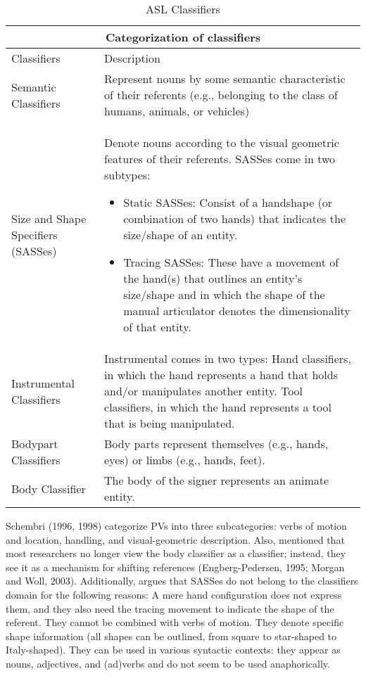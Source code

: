 \begin{table}[H]
    \centering  
\begin{tabular}{ |p{4cm}|p{7cm}|}
\hline
\multicolumn{2}{|c|}{Categorization of classifiers} \\
\hline
 Classifiers & Description \\
\hline
Semantic Classifiers & Represent nouns by some semantic characteristic of their 
referents (e.g., belonging to the class of humans, animals, or vehicles) \\ \hline
Size and Shape Specifiers (SASSes) & Denote nouns according to the visual geometric 
features of their referents. 
SASSes come in two subtypes:
\begin{itemize}
\item Static SASSes: Consist of a handshape (or combination of two hands) that 
indicates the size/shape of an entity.
\item Tracing SASSes: These have a movement of the hand(s) that outlines an entity’s 
size/shape and in which the shape of the manual articulator denotes the 
dimensionality of that entity.
\end{itemize}
\\ \hline
Instrumental Classifiers & Instrumental comes in two types:
 Hand classifiers, in which the hand represents a hand that holds and/or manipulates 
 another entity.
 Tool classifiers, in which the hand represents a tool that is being manipulated.\\ 
 \hline
Bodypart Classifiers   & Body parts represent themselves (e.g., hands, eyes) or limbs 
(e.g., hands, feet). \\ \hline
Body Classifier & The body of the signer represents an animate entity.  \\
\hline
\end{tabular}
\caption{ASL Classifiers}
\label{tab:asl_classifiers}
\end{table}


Schembri (1996, 1998) categorize PVs into three subcategories: verbs of motion and location, handling, and visual-geometric description. Also, \textcite{zwitserlood2012} mentioned that most researchers no longer view the body classifier as a classifier; instead, they see it as a mechanism for shifting references (Engberg-Pedersen, 1995; Morgan and Woll, 2003). Additionally, \textcite{zwitserlood2012}  argues that  SASSes do not belong to the classifiers domain for the following reasons: 
A mere hand configuration does not express them, and they also need the tracing movement to indicate the shape of the referent.
They cannot be combined with verbs of motion. 
They denote specific shape information (all shapes can be outlined, from square to star-shaped to Italy-shaped). They can be used in various syntactic contexts: they appear as nouns, adjectives, and (ad)verbs and do not seem to be used anaphorically.\\

